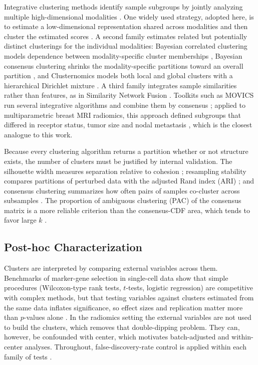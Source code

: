 \documentclass[conference]{IEEEtran}
\begin{document}
Integrative clustering methods identify sample subgroups by jointly analyzing multiple high-dimensional modalities \cite{li2026integrative}. One widely used strategy, adopted here, is to estimate a low-dimensional representation shared across modalities and then cluster the estimated scores \cite{shen2009icluster,hellton2016integrative}. A second family estimates related but potentially distinct clusterings for the individual modalities: Bayesian correlated clustering models dependence between modality-specific cluster memberships \cite{kirk2012bayesian}, Bayesian consensus clustering shrinks the modality-specific partitions toward an overall partition \cite{lock2013consensus}, and Clusternomics models both local and global clusters with a hierarchical Dirichlet mixture \cite{gabasova2017clusternomics}. A third family integrates sample similarities rather than features, as in Similarity Network Fusion \cite{wang2014snf}. Toolkits such as MOVICS run several integrative algorithms and combine them by consensus \cite{lu2020movics}; applied to multiparametric breast MRI radiomics, this approach defined subgroups that differed in receptor status, tumor size and nodal metastasis \cite{he2024integrative}, which is the closest analogue to this work.

Because every clustering algorithm returns a partition whether or not structure exists, the number of clusters must be justified by internal validation. The silhouette width measures separation relative to cohesion \cite{rousseeuw1987silhouettes}; resampling stability compares partitions of perturbed data with the adjusted Rand index (ARI) \cite{hubert1985comparing,lange2004stability}; and consensus clustering summarizes how often pairs of samples co-cluster across subsamples \cite{monti2003consensus}. The proportion of ambiguous clustering (PAC) of the consensus matrix is a more reliable criterion than the consensus-CDF area, which tends to favor large $k$ \cite{senbabaoglu2014critical}.

\subsection{Post-hoc Characterization}

Clusters are interpreted by comparing external variables across them. Benchmarks of marker-gene selection in single-cell data show that simple procedures (Wilcoxon-type rank tests, $t$-tests, logistic regression) are competitive with complex methods, but that testing variables against clusters estimated from the same data inflates significance, so effect sizes and replication matter more than $p$-values alone \cite{pullin2024comparison}. In the radiomics setting the external variables are not used to build the clusters, which removes that double-dipping problem. They can, however, be confounded with center, which motivates batch-adjusted and within-center analyses. Throughout, false-discovery-rate control is applied within each family of tests \cite{benjamini1995fdr}.
\end{document}
